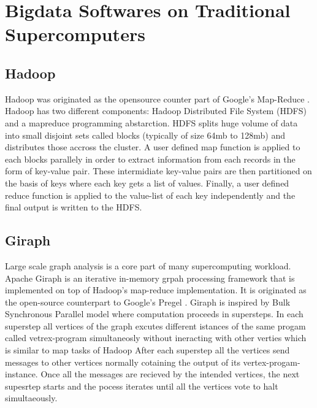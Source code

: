 \documentclass[conference]{IEEEtran}
\begin{document}
\section {Bigdata Softwares on Traditional Supercomputers} \label{Bigdata Softwares on Traditional Supercomputers}
\subsection {Hadoop}
Hadoop was originated as the opensource counter part of Google's Map-Reduce \cite{fw:mapreduce}.
Hadoop has two different components: Hadoop Distributed File System (HDFS) and a mapreduce programming abstarction.
HDFS splits huge volume of data into small disjoint sets called blocks (typically of size 64mb to 128mb) and distributes those accross the cluster.
A user defined map function is applied to each blocks parallely in order to extract information from each records in the form of key-value pair.
These intermidiate key-value pairs are then partitioned on the basis of keys where each key gets a list of values.
Finally, a user defined reduce function is applied to the value-list of each key independently and the final output is written to the HDFS.
 
\subsection {Giraph}
Large scale graph analysis is a core part of many supercomputing workload.
Apache Giraph is an iterative in-memory grpah processing framework that is implemented on top of Hadoop's map-reduce implementation.
It is originated as the open-source counterpart to Google's Pregel \cite{fw:pregel}.
Giraph is inspired by Bulk Synchronous Parallel model \cite{fw:bsp} where computation proceeds in supersteps.
In each superstep all vertices of the graph excutes different istances of the same progam called vetrex-program simultaneosly without ineracting with other verties which is similar to map tasks of Hadoop
After each superstep all the vertices send messages to other vertices normally cotaining the output of its vertex-progam-instance.
Once all the messages are recieved by the intended vertices, the next supesrtep starts and the pocess iterates until all the vertices vote to halt simultaeously.
\end{document}
